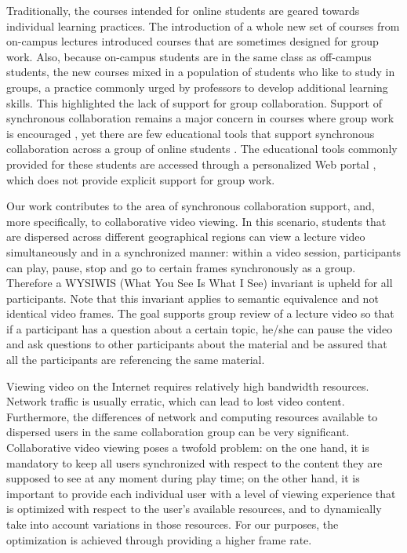 \documentclass{sig-alternate}
\begin{document}
Traditionally, the courses intended for online students are geared
towards individual learning practices.  The introduction of a whole
new set of courses from on-campus lectures introduced courses that are
sometimes designed for group work.  Also, because on-campus students
are in the same class as off-campus students, the new courses mixed in
a population of students who like to study in groups, a practice
commonly urged by professors to develop additional learning skills.
This highlighted the lack of support for group collaboration.  Support
of synchronous collaboration remains a major concern in courses where
group work is encouraged \cite{WELLS}, yet there are few educational
tools that support synchronous collaboration across a group of online
students \cite{BURGESS}.  The educational tools commonly provided for
these students are accessed through a personalized Web portal
\cite{PHOENIX,CAPELLA}, which does not provide explicit support for
group work.

Our work contributes to the area of synchronous collaboration support,
and, more specifically, to collaborative video viewing.  In this
scenario, students that are dispersed across different geographical
regions can view a lecture video simultaneously and in a synchronized
manner: within a video session, participants can play, pause, stop and
go to certain frames synchronously as a group.  Therefore a WYSIWIS
(What You See Is What I See) invariant is upheld for all participants.
Note that this invariant applies to semantic equivalence and not
identical video frames.  The goal supports group review of a lecture
video so that if a participant has a question about a certain topic,
he/she can pause the video and ask questions to other participants
about the material and be assured that all the participants are
referencing the same material.

Viewing video on the Internet requires relatively high bandwidth
resources.  Network traffic is usually erratic, which can lead to lost
video content.  Furthermore, the differences of network and computing
resources available to dispersed users in the same collaboration group
can be very significant.  Collaborative video viewing poses a twofold
problem: on the one hand, it is mandatory to keep all users
synchronized with respect to the content they are supposed to see at
any moment during play time; on the other hand, it is important to
provide each individual user with a level of viewing experience that
is optimized with respect to the user's available resources, and to
dynamically take into account variations in those resources.  For our
purposes, the optimization is achieved through providing a higher
frame rate.
\end{document}
